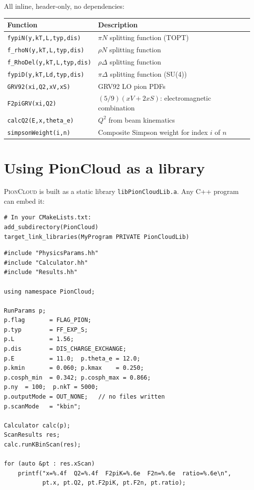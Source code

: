 \documentclass[11pt,a4paper]{article}
\newcommand{\picloud}{\textsc{PionCloud}}
\newcommand{\code}[1]{\texttt{#1}}
\begin{document}
All inline, header-only, no dependencies:

\begin{center}
\begin{tabular}{lp{9cm}}
\toprule
\textbf{Function} & \textbf{Description} \\
\midrule
\code{fypiN(y,kT,L,typ,dis)}   & $\pi N$ splitting function (TOPT) \\
\code{f\_rhoN(y,kT,L,typ,dis)} & $\rho N$ splitting function \\
\code{f\_RhoDel(y,kT,L,typ,dis)} & $\rho\Delta$ splitting function \\
\code{fypiD(y,kT,Ld,typ,dis)}  & $\pi\Delta$ splitting function (SU(4)) \\
\code{GRV92(xi,Q2,xV,xS)}      & GRV92 LO pion PDFs \\
\code{F2piGRV(xi,Q2)}          & $(5/9)(xV+2xS)$: electromagnetic combination \\
\code{calcQ2(E,x,theta\_e)}    & $Q^2$ from beam kinematics \\
\code{simpsonWeight(i,n)}       & Composite Simpson weight for index $i$ of $n$ \\
\bottomrule
\end{tabular}
\end{center}

\section{Using PionCloud as a library}

\picloud{} is built as a static library \texttt{libPionCloudLib.a}.
Any C++ program can embed it:

\begin{lstlisting}[style=bashstyle]
# In your CMakeLists.txt:
add_subdirectory(PionCloud)
target_link_libraries(MyProgram PRIVATE PionCloudLib)
\end{lstlisting}

\begin{lstlisting}[style=cppstyle]
#include "PhysicsParams.hh"
#include "Calculator.hh"
#include "Results.hh"

using namespace PionCloud;

RunParams p;
p.flag       = FLAG_PION;
p.typ        = FF_EXP_S;
p.L          = 1.56;
p.dis        = DIS_CHARGE_EXCHANGE;
p.E          = 11.0;  p.theta_e = 12.0;
p.kmin       = 0.060; p.kmax    = 0.250;
p.cosph_min  = 0.342; p.cosph_max = 0.866;
p.ny  = 100;  p.nkT = 5000;
p.outputMode = OUT_NONE;   // no files written
p.scanMode   = "kbin";

Calculator calc(p);
ScanResults res;
calc.runKBinScan(res);

for (auto &pt : res.xScan)
    printf("x=%.4f  Q2=%.4f  F2piK=%.6e  F2n=%.6e  ratio=%.6e\n",
           pt.x, pt.Q2, pt.F2piK, pt.F2n, pt.ratio);
\end{lstlisting}
\end{document}
